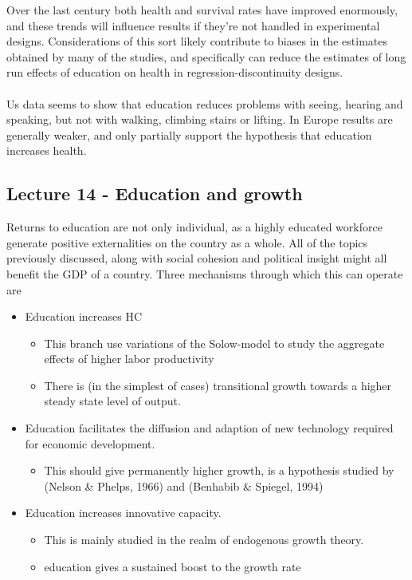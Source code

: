 \documentclass[12pt, a4paper]{article}
\begin{document}
\begin{multicols}{2}
Over the last century both health and survival rates have improved enormously, and these trends will influence results if they're not handled in experimental designs. Considerations of this sort likely contribute to biases in the estimates obtained by many of the studies, and specifically can reduce the estimates of long run effects of education on health in regression-discontinuity designs.
\\ \\
Us data seems to show that education reduces problems with seeing, hearing and speaking, but not with walking, climbing stairs or lifting. In Europe results are generally weaker, and only partially support the hypothesis that education increases health.



\subsection{Lecture 14 - Education and growth}
Returns to education are not only individual, as a highly educated workforce generate positive externalities on the country as a whole. All of the topics previously discussed, along with social cohesion and political insight might all benefit the GDP of a country. Three mechanisms through which this can operate are
\begin{itemize}
\item[1)] Education increases HC
    \begin{itemize}
    \item This branch use variations of the Solow-model to study the aggregate effects of higher labor productivity
    \item There is (in the simplest of cases) transitional growth towards a higher steady state level of output.
    \end{itemize}
\item[2)] Education facilitates the diffusion and adaption of new technology required for economic development.
    \begin{itemize}
    \item This should give permanently higher growth, is a hypothesis studied by (Nelson \& Phelps, 1966) and (Benhabib \& Spiegel, 1994)
    \end{itemize}
\item[3)] Education increases innovative capacity.
\begin{itemize}
\item This is mainly studied in the realm of endogenous growth theory.
\item education gives a sustained boost to the growth rate
\end{itemize}
\end{itemize}


\end{multicols}
\end{document}
